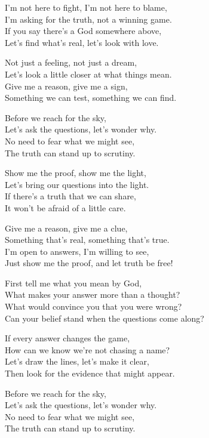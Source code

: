 \begin{lyrics}
I'm not here to fight, I'm not here to blame,\\
I'm asking for the truth, not a winning game.\\
If you say there's a God somewhere above,\\
Let's find what's real, let's look with love.

Not just a feeling, not just a dream,\\
Let's look a little closer at what things mean.\\
Give me a reason, give me a sign,\\
Something we can test, something we can find.

Before we reach for the sky,\\
Let's ask the questions, let's wonder why.\\
No need to fear what we might see,\\
The truth can stand up to scrutiny.

Show me the proof, show me the light,\\
Let's bring our questions into the light.\\
If there's a truth that we can share,\\
It won't be afraid of a little care.

Give me a reason, give me a clue,\\
Something that's real, something that's true.\\
I'm open to answers, I'm willing to see,\\
Just show me the proof, and let truth be free!

First tell me what you mean by God,\\
What makes your answer more than a thought?\\
What would convince you that you were wrong?\\
Can your belief stand when the questions come along?

If every answer changes the game,\\
How can we know we're not chasing a name?\\
Let's draw the lines, let's make it clear,\\
Then look for the evidence that might appear.

Before we reach for the sky,\\
Let's ask the questions, let's wonder why.\\
No need to fear what we might see,\\
The truth can stand up to scrutiny.


\end{lyrics}
